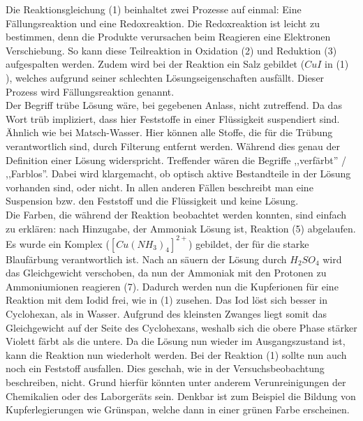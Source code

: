 \documentclass[12pt, a4paper]{article}
\begin{document}
Die Reaktionsgleichung (1) beinhaltet zwei Prozesse auf einmal: Eine Fällungsreaktion und eine Redoxreaktion. Die Redoxreaktion ist leicht zu bestimmen, denn die Produkte verursachen beim Reagieren eine Elektronen Verschiebung. So kann diese Teilreaktion in Oxidation (2) und Reduktion (3) aufgespalten werden. Zudem wird bei der Reaktion ein Salz gebildet ($CuI$ in (1) ), welches aufgrund seiner schlechten Lösungseigenschaften ausfällt. Dieser Prozess wird Fällungsreaktion genannt. \\ Der Begriff trübe Lösung wäre, bei gegebenen Anlass, nicht zutreffend. Da das Wort trüb impliziert, dass hier Feststoffe in einer Flüssigkeit suspendiert sind. Ähnlich wie bei Matsch-Wasser. Hier können alle Stoffe, die für die Trübung verantwortlich sind, durch Filterung entfernt werden. Während dies genau der Definition einer Lösung widerspricht. Treffender wären die Begriffe ,,verfärbt'' / ,,Farblos''. Dabei wird klargemacht, ob optisch aktive Bestandteile in der Lösung vorhanden sind, oder nicht. In allen anderen Fällen beschreibt man eine Suspension bzw. den Feststoff und die Flüssigkeit und keine Lösung.\\ Die Farben, die während der Reaktion beobachtet werden konnten, sind einfach zu erklären: nach Hinzugabe, der Ammoniak Lösung ist, Reaktion (5) abgelaufen. Es wurde ein Komplex ($\displaystyle{\left[Cu(NH_3)_4\right]^{2+}}$) gebildet, der für die starke Blaufärbung verantwortlich ist. Nach an säuern der Lösung durch $H_2SO_4$ wird das Gleichgewicht verschoben, da nun der Ammoniak mit den Protonen zu Ammoniumionen reagieren (7). Dadurch werden nun die Kupferionen für eine Reaktion mit dem Iodid frei, wie in (1) zusehen. Das Iod löst sich besser in Cyclohexan, als in Wasser. Aufgrund des kleinsten Zwanges liegt somit das Gleichgewicht auf der Seite des Cyclohexans, weshalb sich die obere Phase stärker Violett färbt als die untere. Da die Lösung nun wieder im Ausgangszustand ist, kann die Reaktion nun wiederholt werden. Bei der Reaktion (1) sollte nun auch noch ein Feststoff ausfallen. Dies geschah, wie in der Versuchsbeobachtung beschreiben, nicht. Grund hierfür könnten unter anderem Verunreinigungen der Chemikalien oder des Laborgeräts sein. Denkbar ist zum Beispiel die Bildung von Kupferlegierungen wie Grünspan, welche dann in einer grünen Farbe erscheinen.
\end{document}
